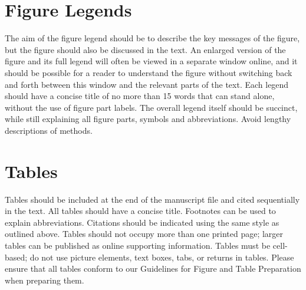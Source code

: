 \documentclass[10pt]{article}
\begin{document}


\section*{Figure Legends}

The aim of the figure legend should be to describe the key messages of the figure, but 
the figure should also be discussed in the text. An enlarged version of the figure and its full legend 
will often be viewed in a separate window online, and it should be possible for a reader to understand the figure 
without switching back and forth between this window and the relevant parts of the text. Each legend should have 
a concise title of no more than 15 words that can stand alone, without the use of figure part labels. The overall 
legend itself should be succinct, while still explaining all figure parts, symbols and abbreviations. Avoid lengthy descriptions of methods.

\section*{Tables}

Tables should be included at the end of the manuscript file and cited sequentially in the text. 
All tables should have a concise title. Footnotes can be used to explain abbreviations. 
Citations should be indicated using the same style as outlined above. Tables should not occupy more than one 
printed page; larger tables can be published as online supporting information. Tables must be cell-based; 
do not use picture elements, text boxes, tabs, or returns in tables. Please ensure that all tables conform to our 
Guidelines for Figure and Table Preparation when preparing them.
\end{document}
